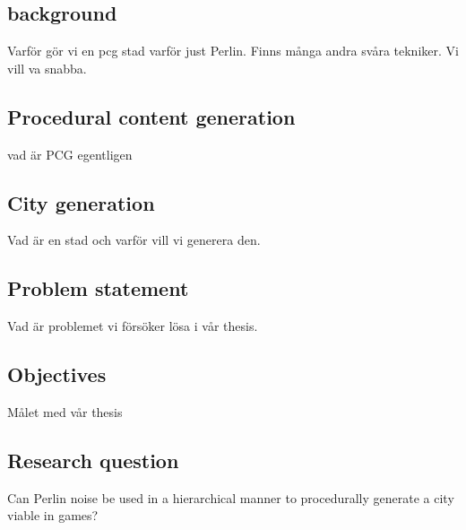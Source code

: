 \subsection{background}
Varför gör vi en pcg stad
varför just Perlin.
Finns många andra svåra tekniker.
Vi vill va snabba.

\subsection{Procedural content generation}
vad är PCG egentligen

\subsection{City generation}
Vad är en stad och varför vill vi generera den.

\subsection{Problem statement}
Vad är problemet vi försöker lösa i vår thesis.

\subsection{Objectives}
Målet med vår thesis

\subsection{Research question}
Can Perlin noise be used in a hierarchical manner to procedurally generate a city viable in games?
\\
